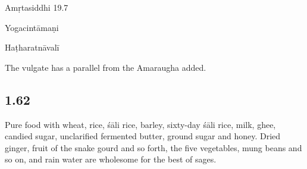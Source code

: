 \begin{ekdosis}
\begin{sources}[hp01_061]
Amṛtasiddhi 19.7

\begin{versinnote}
\end{versinnote}

\end{sources}

\begin{testimonia}[hp01_061]
Yogacintāmaṇi

\begin{versinnote}
\end{versinnote}

Haṭharatnāvalī

\begin{versinnote}
\end{versinnote}

\end{testimonia}

\begin{philcomm}[hp01_061]
The vulgate has a parallel from the Amaraugha added. 
\end{philcomm}

\subsection*{1.62}
\begin{translation}[hp01_062]
Pure food with wheat, rice, śāli rice, barley, sixty-day śāli rice, milk, ghee, candied sugar, unclarified fermented butter, ground sugar and honey. Dried ginger, fruit of the snake gourd and so forth, the five vegetables, mung beans and so on, and rain water are wholesome for the best of sages.
\end{translation}

\begin{sources}[hp01_062]
\end{sources}


\end{ekdosis}
